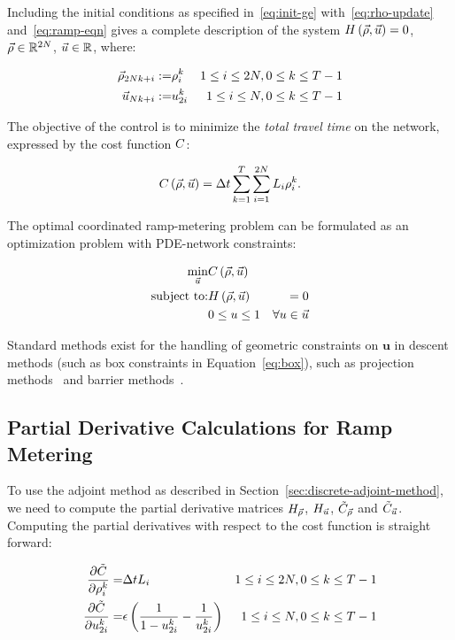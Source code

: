 Including the initial conditions as specified in~\eqref{eq:init-ge}
with~\eqref{eq:rho-update} and~\eqref{eq:ramp-eqn} gives
a complete description of the system $H\left(\vec{\rho},\vec{u}\right)=0$,
$\vec{\rho}\in\mathbb{R}^{2N}$, $\vec{u}\in\mathbb{R}$, where:

\begin{eqnarray*}
\vec{\rho}_{2Nk+i}:= & \rho_{i}^{k} & 1\le i\le2N,0\le k\le T-1\\
\vec{u}_{Nk+i}:= & u_{2i}^{k} & 1\le i\le N,0\le k\le T-1
\end{eqnarray*}


The objective of the control is to minimize the \emph{total travel
time }on the network, expressed by the cost function $C$:

\[
C\left(\vec{\rho},\vec{u}\right)=\Delta t\sum_{k=1}^{T}\sum_{i=1}^{2N}L_{i}\rho_{i}^{k}.
\]


The optimal coordinated ramp-metering problem can be formulated as
an optimization problem with PDE-network constraints:

\begin{eqnarray}
\min_{\vec{u}} & C\left(\vec{\rho},\vec{u}\right)\label{eq:full}\\
\text{subject to:} & H\left(\vec{\rho},\vec{u}\right) & =0\nonumber \\
& 0\le u\le1 & \forall u\in\vec{u}  \label{eq:box}
\end{eqnarray}

Standard methods exist for the handling of geometric constraints on $\mathbf{u}$ in descent methods (such as box constraints in Equation~\eqref{eq:box}), such as projection methods~\cite{d2010modeling} and barrier methods~\cite{Fiacco1990Nonlinear,Boyd2010b,Bayen2006}.

\subsection{Partial Derivative Calculations for Ramp Metering}
\label{sec:Applications-to-Optimal}

To use the adjoint method as described in Section~\ref{sec:discrete-adjoint-method},
we need to compute the partial derivative matrices $H_{\vec{\rho}}$, $H_{\vec{u}}$,
$\tilde{C}_{\vec{\rho}}$ and $\tilde{C}_{\vec{u}}$. Computing the partial
derivatives with respect to the cost function is straight forward:

\begin{eqnarray*}
\frac{\partial\tilde{C}}{\partial\rho_{i}^{k}}= & \Delta tL_{i} & 1\le i\le2N,0\le k\le T-1\\
\frac{\partial\tilde{C}}{\partial u_{2i}^{k}}= & \epsilon\left(\frac{1}{1-u_{2i}^{k}}-\frac{1}{u_{2i}^{k}}\right) & 1\le i\le N,0\le k\le T-1
\end{eqnarray*}


